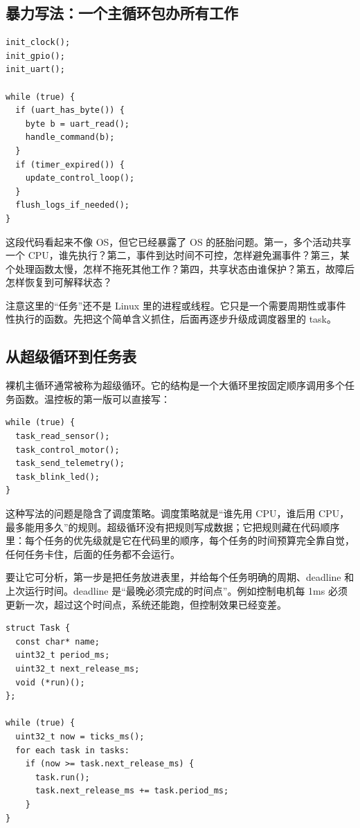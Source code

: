 \subsection{暴力写法：一个主循环包办所有工作}

\begin{lstlisting}
init_clock();
init_gpio();
init_uart();

while (true) {
  if (uart_has_byte()) {
    byte b = uart_read();
    handle_command(b);
  }
  if (timer_expired()) {
    update_control_loop();
  }
  flush_logs_if_needed();
}
\end{lstlisting}

这段代码看起来不像 OS，但它已经暴露了 OS 的胚胎问题。第一，多个活动共享一个 CPU，谁先执行？第二，事件到达时间不可控，怎样避免漏事件？第三，某个处理函数太慢，怎样不拖死其他工作？第四，共享状态由谁保护？第五，故障后怎样恢复到可解释状态？

注意这里的“任务”还不是 Linux 里的进程或线程。它只是一个需要周期性或事件性执行的函数。先把这个简单含义抓住，后面再逐步升级成调度器里的 task。

\subsection{从超级循环到任务表}

裸机主循环通常被称为超级循环。它的结构是一个大循环里按固定顺序调用多个任务函数。温控板的第一版可以直接写：

\begin{lstlisting}
while (true) {
  task_read_sensor();
  task_control_motor();
  task_send_telemetry();
  task_blink_led();
}
\end{lstlisting}

这种写法的问题是隐含了调度策略。调度策略就是“谁先用 CPU，谁后用 CPU，最多能用多久”的规则。超级循环没有把规则写成数据；它把规则藏在代码顺序里：每个任务的优先级就是它在代码里的顺序，每个任务的时间预算完全靠自觉，任何任务卡住，后面的任务都不会运行。

要让它可分析，第一步是把任务放进表里，并给每个任务明确的周期、deadline 和上次运行时间。deadline 是“最晚必须完成的时间点”。例如控制电机每 1ms 必须更新一次，超过这个时间点，系统还能跑，但控制效果已经变差。

\begin{lstlisting}
struct Task {
  const char* name;
  uint32_t period_ms;
  uint32_t next_release_ms;
  void (*run)();
};

while (true) {
  uint32_t now = ticks_ms();
  for each task in tasks:
    if (now >= task.next_release_ms) {
      task.run();
      task.next_release_ms += task.period_ms;
    }
}
\end{lstlisting}

